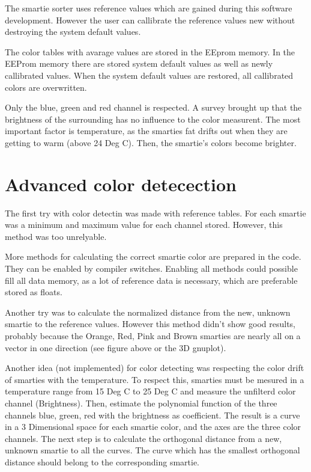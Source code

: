 The smartie sorter uses reference values which are gained during this software development. However the user can callibrate the reference values new without destroying the system default values.

The color tables with avarage values are stored in the EEprom memory. In the EEProm memory there are stored system default values as well as newly callibrated values. When the system default values are restored, all callibrated colors are overwritten.

Only the blue, green and red channel is respected. A survey brought up that the brightness of the surrounding has no influence to the color measurent. The most important factor is temperature, as the smarties fat drifts out when they are getting to warm (above 24 Deg C). Then, the smartie's colors become brighter.\hypertarget{index_adv_col_det}{}\section{Advanced color detecection}\label{index_adv_col_det}
The first try with color detectin was made with reference tables. For each smartie was a minimum and maximum value for each channel stored. However, this method was too unrelyable.

More methods for calculating the correct smartie color are prepared in the code. They can be enabled by compiler switches. Enabling all methods could possible fill all data memory, as a lot of reference data is necessary, which are preferable stored as floats.

Another try was to calculate the normalized distance from the new, unknown smartie to the reference values. However this method didn't show good results, probably because the Orange, Red, Pink and Brown smarties are nearly all on a vector in one direction (see figure above or the 3D gnuplot).

Another idea (not implemented) for color detecting was respecting the color drift of smarties with the temperature. To respect this, smarties must be mesured in a temperature range from 15 Deg C to 25 Deg C and measure the unfilterd color channel (Brightness). Then, estimate the polynomial function of the three channels blue, green, red with the brightness as coefficient. The result is a curve in a 3 Dimensional space for each smartie color, and the axes are the three color channels. The next step is to calculate the orthogonal distance from a new, unknown smartie to all the curves. The curve which has the smallest orthogonal distance should belong to the corresponding smartie.

